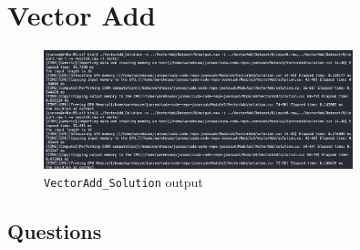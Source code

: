 \documentclass[../main.tex]{subfiles}
\begin{document}
\pagestyle{fancy}

\renewcommand{\thefigure}{\arabic{figure}}

\section*{Vector Add}

\begin{figure}
    [ht]
    \centering
    \includegraphics[width=0.8\textwidth]{vectoradd.png}
    \caption{\texttt{VectorAdd\_Solution} output}
\end{figure}

\subsection*{Questions}
\end{document}
